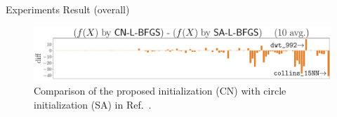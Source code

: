 \documentclass[dvipdfmx,13pt,aspectratio=169]{beamer}
\begin{document}
\begin{frame}{Experiments Result (overall)}
\begin{figure}[h]
\begin{minipage}{0.5\columnwidth}
      \end{minipage}%
      \begin{minipage}{0.5\columnwidth}
        \centering
        \includegraphics[width=\columnwidth]{../main/circle/plot/diff_L-BFGS_50.pdf}
      \end{minipage}%
      \caption{
        Comparison of the proposed initialization (\textsf{CN}) with circle initialization (\textsf{SA}) in Ref.~\cite{ghassemitoosiSimulatedAnnealingPreProcessing2016}.
      }
      \label{fig:diff}
    \end{figure}
  \end{frame}
\fi
\end{document}
